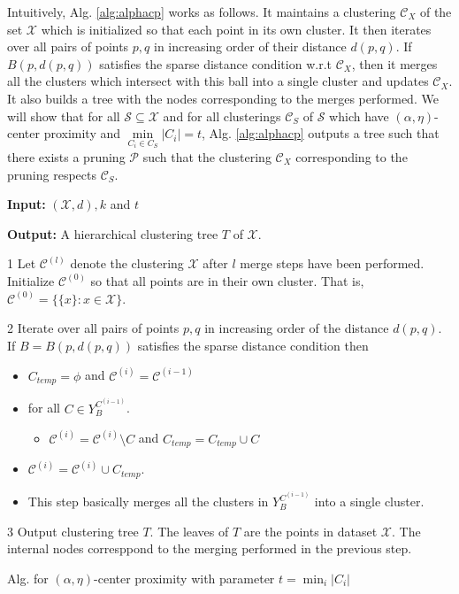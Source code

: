 \documentclass[11pt]{article}
\newcommand{\mc}{\mathcal}
\newenvironment{alg}{
    \begin{list}{}{
        \setlength{\itemsep}{2pt}
        \setlength{\parsep}{0pt}
        \setlength{\parskip}{0pt}
        \setlength{\topsep}{1pt}
    }
}
{
    \end{list}
}
\begin{document}
Intuitively, Alg. \ref{alg:alphacp} works as follows. It maintains a clustering $\mc C_X$ of the set $\mc X$ which is initialized so that  each point in its own cluster. It then iterates over all pairs of points $p, q$ in increasing order of their distance $d(p, q)$. If $B(p, d(p,q))$ satisfies the sparse distance condition w.r.t $\mc C_X$, then it merges all the clusters which intersect with this ball into a single cluster and updates $\mc C_X$. It also builds a tree with the nodes corresponding to the merges performed. We will show that for all $\mc S \subseteq \mc X$ and for all clusterings $\mc C_S$ of $\mc S$ which have $(\alpha, \eta)$-center proximity and $\min\limits_{C_i \in C_S} |C_i| = t$, Alg. \ref{alg:alphacp} outputs a tree such that there exists a pruning $\mc P$ such that the clustering $\mc C_X$ corresponding to the pruning respects $\mc C_S$. %

\begin{algorithm}[!ht]
\begin{alg}
	\item \textbf{Input: } $(\mc X, d), k$ and $t$
	\item \textbf{Output: } A hierarchical clustering tree $T$ of $\mc X$.
	\item[1] Let $\mc C^{(l)}$ denote the clustering $\mc X$ after $l$ merge steps have been performed. Initialize $\mc C^{(0)}$ so that all points are in their own cluster. That is, $\mc C^{(0)} = \{ \{x\}: x \in \mc X\}$.
	\item[2] Iterate over all pairs of points $p, q$ in increasing order of the distance $d(p, q)$. If $B = B(p, d(p, q))$ satisfies the sparse distance condition then
	\begin{itemize}
	\renewcommand\labelitemi{}
		\item $C_{temp} = \phi$ and $\mc C^{(i)} = \mc C^{(i-1)}$
		\item for all $C \in Y_B^{C^{(i-1)}}$.
		\begin{itemize}
		\renewcommand\labelitemii{}
			\item $\mc C^{(i)} = \mc C^{(i)} \setminus C$ and $C_{temp} = C_{temp} \cup C$
		\end{itemize}
		\item $\mc C^{(i)} = \mc C^{(i)} \cup C_{temp}$.
		\item This step basically merges all the clusters in $Y_B^{C^{(i-1)}}$ into a single cluster.
	\end{itemize}
	\item[3] Output clustering tree $T$. The leaves of $T$ are the points in dataset $\mc X$. The internal nodes corresppond to the merging performed in the previous step.
\end{alg}
\caption{Alg. for $(\alpha, \eta)$-center proximity with parameter $t = \min_i |C_i|$}
\label{alg:alphacp}
\end{algorithm}
\end{document}
